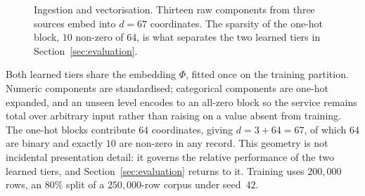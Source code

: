\documentclass[conference]{IEEEtran}
\begin{document}
\begin{figure}[t]
\centering
{}
\caption{Ingestion and vectorisation. Thirteen raw components from
three sources embed into $d=67$ coordinates. The sparsity of the
one-hot block, $10$ non-zero of $64$, is what separates the two learned
tiers in Section~\ref{sec:evaluation}.}
\label{fig:ingest}
\end{figure}

Both learned tiers share the embedding $\Phi$, fitted once on the
training partition. Numeric components are standardised; categorical
components are one-hot expanded, and an unseen level encodes to an
all-zero block so the service remains total over arbitrary input rather
than raising on a value absent from training. The one-hot blocks
contribute $64$ coordinates, giving $d = 3 + 64 = 67$, of which $64$
are binary and exactly $10$ are non-zero in any record. This geometry
is not incidental presentation detail: it governs the relative
performance of the two learned tiers, and
Section~\ref{sec:evaluation} returns to it. Training uses $200{,}000$
rows, an $80\%$ split of a $250{,}000$-row corpus under seed~$42$.
\end{document}
